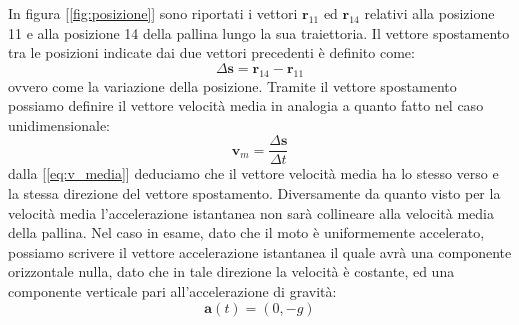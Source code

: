 \documentclass[a4paper,10pt,oneside]{article}
\begin{document}
In figura [\ref{fig:posizione}] sono riportati i vettori $\mathbf{r}_{11}$ ed $\mathbf{r}_{14}$ relativi alla posizione 11 e alla posizione 14 della pallina lungo la sua traiettoria. Il vettore spostamento tra le posizioni indicate dai due vettori precedenti è definito come:
\begin{equation}
 \Delta \mathbf{s}=\mathbf{r}_{14}-\mathbf{r}_{11}
\end{equation}
ovvero come la variazione della posizione. Tramite il vettore spostamento possiamo definire il vettore velocità media in analogia a quanto fatto nel caso unidimensionale:
\begin{equation}\label{eq:v_media}
 \mathbf{v}_m=\frac{\Delta \mathbf{s}}{\Delta t}
\end{equation}
dalla [\ref{eq:v_media}] deduciamo che il vettore velocità media ha lo stesso verso e la stessa direzione del vettore spostamento.
Diversamente da quanto visto per la velocità media l'accelerazione istantanea non sarà collineare alla velocità media della pallina. Nel caso in esame, dato che il moto è uniformemente accelerato, possiamo scrivere il vettore accelerazione istantanea il quale avrà una componente orizzontale nulla, dato che in tale direzione la velocità è costante, ed una componente verticale pari all'accelerazione di gravità:
\begin{equation}\label{eq:accelerazione_inc}
 \mathbf{a}(t)=(0,-g)
\end{equation}
\end{document}
